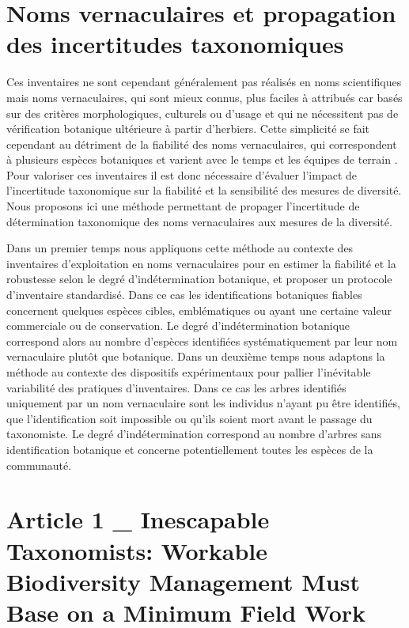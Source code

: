 \documentclass[
  11pt,
  french,
  A4paper,
  extrafontsizes,onecolumn,openright
  ]{memoir}
\begin{document}
\section{Noms vernaculaires et propagation des incertitudes
taxonomiques}\label{noms-vernaculaires-et-propagation-des-incertitudes-taxonomiques}

Ces inventaires ne sont cependant généralement pas réalisés en noms
scientifiques mais noms vernaculaires, qui sont mieux connus, plus
faciles à attribués car basés sur des critères morphologiques, culturels
ou d'usage et qui ne nécessitent pas de vérification botanique
ultérieure à partir d'herbiers. Cette simplicité se fait cependant au
détriment de la fiabilité des noms vernaculaires, qui correspondent à
plusieurs espèces botaniques et varient avec le temps et les équipes de
terrain \autocite{Oldeman1968}. Pour valoriser ces inventaires il est
donc nécessaire d'évaluer l'impact de l'incertitude taxonomique sur la
fiabilité et la sensibilité des mesures de diversité. Nous proposons ici
une méthode permettant de propager l'incertitude de détermination
taxonomique des noms vernaculaires aux mesures de la diversité.

Dans un premier temps nous appliquons cette méthode au contexte des
inventaires d'exploitation en noms vernaculaires pour en estimer la
fiabilité et la robustesse selon le degré d'indétermination botanique,
et proposer un protocole d'inventaire standardisé. Dans ce cas les
identifications botaniques fiables concernent quelques espèces cibles,
emblématiques ou ayant une certaine valeur commerciale ou de
conservation. Le degré d'indétermination botanique correspond alors au
nombre d'espèces identifiées systématiquement par leur nom vernaculaire
plutôt que botanique. Dans un deuxième temps nous adaptons la méthode au
contexte des dispositifs expérimentaux pour pallier l'inévitable
variabilité des pratiques d'inventaires. Dans ce cas les arbres
identifiés uniquement par un nom vernaculaire sont les individus n'ayant
pu être identifiés, que l'identification soit impossible ou qu'ils
soient mort avant le passage du taxonomiste. Le degré d'indétermination
correspond au nombre d'arbres sans identification botanique et concerne
potentiellement toutes les espèces de la communauté.

\section{Article 1 \_ Inescapable Taxonomists: Workable Biodiversity
Management Must Base on a Minimum Field
Work}\label{article-1-_-inescapable-taxonomists-workable-biodiversity-management-must-base-on-a-minimum-field-work}
\end{document}
